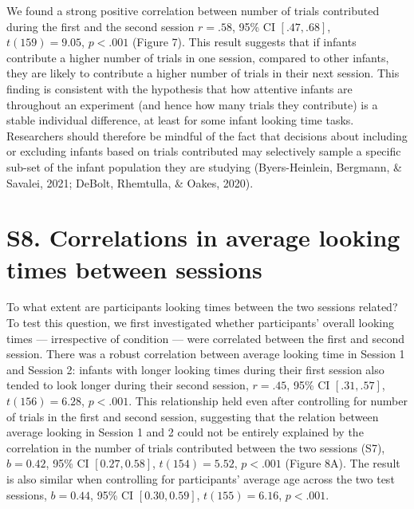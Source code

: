 \documentclass[
  man, donotrepeattitle,floatsintext]{apa6}
\begin{document}
We found a strong positive correlation between number of trials contributed during the first and the second session \(r = .58\), 95\% CI \([.47, .68]\), \(t(159) = 9.05\), \(p < .001\) (Figure 7).
This result suggests that if infants contribute a higher number of trials in one session, compared to other infants, they are likely to contribute a higher number of trials in their next session.
This finding is consistent with the hypothesis that how attentive infants are throughout an experiment (and hence how many trials they contribute) is a stable individual difference, at least for some infant looking time tasks.
Researchers should therefore be mindful of the fact that decisions about including or excluding infants based on trials contributed may selectively sample a specific sub-set of the infant population they are studying (Byers-Heinlein, Bergmann, \& Savalei, 2021; DeBolt, Rhemtulla, \& Oakes, 2020).

\newpage

\hypertarget{s8.-correlations-in-average-looking-times-between-sessions}{%
\section{S8. Correlations in average looking times between sessions}\label{s8.-correlations-in-average-looking-times-between-sessions}}

To what extent are participants looking times between the two sessions related?
To test this question, we first investigated whether participants' overall looking times --- irrespective of condition --- were correlated between the first and second session.
There was a robust correlation between average looking time in Session 1 and Session 2: infants with longer looking times during their first session also tended to look longer during their second session, \(r = .45\), 95\% CI \([.31, .57]\), \(t(156) = 6.28\), \(p < .001\).
This relationship held even after controlling for number of trials in the first and second session, suggesting that the relation between average looking in Session 1 and 2 could not be entirely explained by the correlation in the number of trials contributed between the two sessions (S7), \(b = 0.42\), 95\% CI \([0.27, 0.58]\), \(t(154) = 5.52\), \(p < .001\) (Figure 8A).
The result is also similar when controlling for participants' average age across the two test sessions, \(b = 0.44\), 95\% CI \([0.30, 0.59]\), \(t(155) = 6.16\), \(p < .001\).
\end{document}
